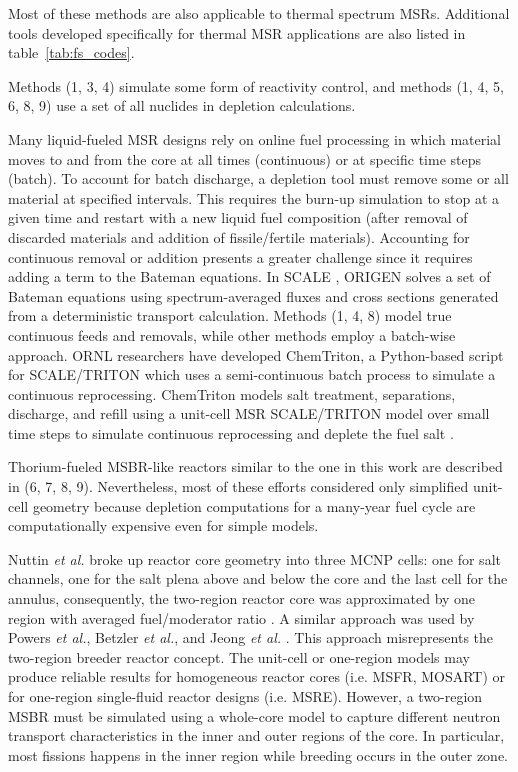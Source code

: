 Most of these methods are also applicable to thermal spectrum \glspl{MSR}. 
Additional tools developed specifically for thermal \gls{MSR} applications are 
also listed in table~\ref{tab:fs_codes}.

Methods (1, 3, 4) simulate some form of reactivity control, and methods (1, 4, 
5, 6, 8, 9) use a set of all nuclides in depletion calculations. 

Many liquid-fueled \gls{MSR} designs rely on online fuel processing in which 
material moves to and from the core at all times (continuous) or at specific 
time steps (batch). To account for batch discharge, a depletion tool must 
remove some or all material at specified intervals. This requires the burn-up 
simulation to stop at a given time and restart with a new liquid fuel 
composition (after removal of discarded materials and addition of 
fissile/fertile materials). Accounting for continuous removal or addition  
presents a greater challenge since it requires adding a term to the Bateman 
equations. In SCALE \cite{bowman_scale_2011}, ORIGEN \cite{gauld_isotopic_2011} 
solves a set of Bateman equations using spectrum-averaged fluxes and cross 
sections generated from a deterministic transport calculation. Methods (1, 4, 
8) model true continuous feeds and removals, while other methods employ a 
batch-wise approach. \gls{ORNL} researchers have developed ChemTriton, a 
Python-based script for SCALE/TRITON which uses a semi-continuous batch process 
to simulate a continuous reprocessing. ChemTriton models salt treatment, 
separations, discharge, and refill using a unit-cell \gls{MSR} SCALE/TRITON 
model over small time steps to simulate continuous reprocessing and deplete the 
fuel salt \cite{powers_new_2013}.

Thorium-fueled \gls{MSBR}-like reactors similar to the one in this work are 
described in (6, 7, 8, 9). Nevertheless, most of these efforts considered only 
simplified unit-cell geometry because depletion computations for a many-year 
fuel cycle are computationally expensive even for simple models. 

Nuttin \emph{et al.} broke up reactor core geometry into three \gls{MCNP} cells: 
one for salt channels, one for the salt plena above and below the core and the 
last cell for the annulus, consequently, the two-region reactor core was 
approximated by one region with averaged fuel/moderator ratio 
\cite{nuttin_potential_2005}.  A similar approach was used by Powers \emph{et 
al.}, Betzler \emph{et al.}, and Jeong \emph{et al.} 
\cite{powers_new_2013,powers_inventory_2014,betzler_modeling_2016, 
betzler_molten_2017, jeong_development_2014, jeong_equilibrium_2016}. This 
approach misrepresents the two-region breeder reactor concept. The unit-cell or 
one-region models may produce reliable results for homogeneous reactor cores 
(i.e. \gls{MSFR}, \gls{MOSART}) or for one-region single-fluid reactor designs 
(i.e. \gls{MSRE}). However, a two-region \gls{MSBR} must be simulated using a whole-core 
model to capture different neutron transport characteristics in the inner and 
outer regions of the core. In particular, most fissions happens in the inner 
region while breeding occurs in the outer zone.  

